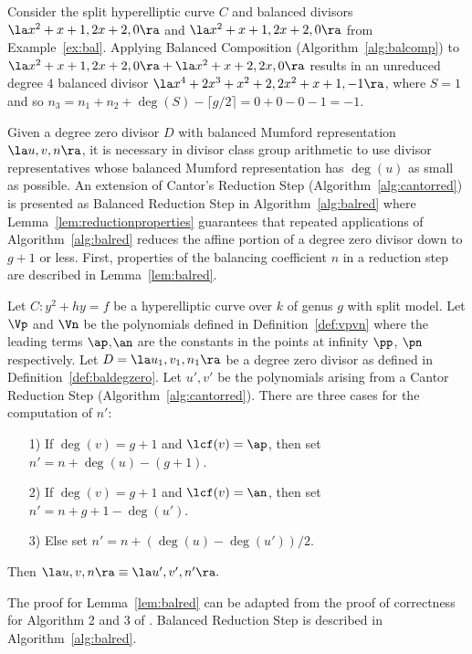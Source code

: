 \be\label{ex:balunreduced}
Consider the split hyperelliptic curve $C$ and balanced divisors  $\la x^2 + x +
1,2x + 2,0 \ra$ and $\la x^2 + x + 1,2x + 2,0 \ra$ from Example~\ref{ex:bal}.
Applying Balanced Composition (Algorithm~\ref{alg:balcomp}) to $\la x^2 + x +
1,2x + 2,0 \ra + \la x^2 + x + 2,2x,0 \ra$ results in an unreduced degree $4$
balanced divisor $\la x^4 + 2x^3 + x^2 + 2, 2x^2 + x + 1, -1 \ra$, where $S = 1$
and so $n_3 = n_1 + n_2 +\deg(S) - \lceil g/2 \rceil = 0 + 0 - 0 - 1 = -1.$
\ee

Given a degree zero divisor $D$ with balanced Mumford representation $\la u,v,n \ra$,
it is necessary in divisor class group arithmetic to use divisor representatives
whose balanced Mumford representation has $\deg(u)$ as small as possible. An
extension of Cantor's Reduction Step (Algorithm~\ref{alg:cantorred}) is presented as
Balanced Reduction Step in Algorithm~\ref{alg:balred} where
Lemma~\ref{lem:reductionproperties} guarantees that repeated applications of
Algorithm~\ref{alg:balred} reduces the affine portion of a degree zero divisor
down to $g + 1$ or less. First, properties of the balancing coefficient $n$ in a
reduction step are described in Lemma~\ref{lem:balred}.

\bl\label{lem:balred} \cite[Adapted from Section~3]{Galbraith_balanced_2008} Let
$C : y^2 + hy = f$ be a hyperelliptic curve over $k$ of genus $g$ with split
model. Let $\Vp$ and $\Vn$ be the polynomials defined in
Definition~\ref{def:vpvn} where the leading terms $\ap$,$\an$ are the constants
in the points at infinity $\pp$, $\pn$ respectively. Let $D =\la u_1,v_1,n_1 \ra$ be a
degree zero divisor as defined in Definition~\ref{def:baldegzero}. Let $u',v'$
be the polynomials arising from a Cantor Reduction Step
(Algorithm~\ref{alg:cantorred}). There are three cases for the computation of
$n'$:
\begin{itemize}
  
  \item[1)] If $\deg(v) = g+1$ and $\lcf(v) = \ap$, then set $n' = n + \deg(u) - (g+1)$. 
  \item[2)] If $\deg(v) = g+1$ and $\lcf(v) = \an$, then set $n' = n + g + 1 - \deg(u')$.
  \item[3)] Else set $n' = n + (\deg(u) - \deg(u'))/2$.
\end{itemize} Then $\la u,v,n \ra \equiv \la u',v',n' \ra.$
\el

The proof for Lemma~\ref{lem:balred} can be adapted from the proof of
correctness for Algorithm 2 and 3 of \cite{Galbraith_balanced_2008}. Balanced
Reduction Step is described in Algorithm~\ref{alg:balred}.

